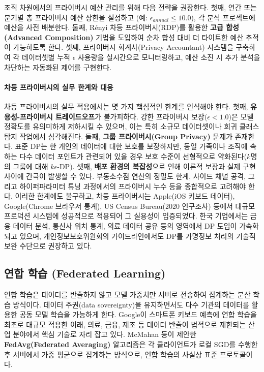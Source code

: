 조직 차원에서의 프라이버시 예산 관리를 위해 다음 전략을 권장한다.
첫째, 연간 또는 분기별 총 프라이버시 예산 상한을 설정하고
(예: $\epsilon_{annual} \leq 10.0$), 각 분석 프로젝트에 예산을 사전 배분한다.
둘째, R\'{e}nyi 차등 프라이버시(RDP)를 활용한
\textbf{고급 합성(Advanced Composition)} 기법을 도입하여
순차 합성 대비 더 타이트한 예산 추적이 가능하도록 한다.
셋째, 프라이버시 회계사(Privacy Accountant) 시스템을 구축하여
각 데이터셋별 누적 $\epsilon$ 사용량을 실시간으로 모니터링하고,
예산 소진 시 추가 분석을 차단하는 자동화된 제어를 구현한다.

\paragraph{차등 프라이버시의 실무 한계와 대응}

차등 프라이버시의 실무 적용에서는 몇 가지 핵심적인 한계를 인식해야 한다. 첫째, \textbf{유용성-프라이버시 트레이드오프}가 불가피하다. 강한 프라이버시 보장($\epsilon < 1.0$)은 모델 정확도를 유의미하게 저하시킬 수 있으며, 이는 특히 소규모 데이터셋이나 희귀 클래스 탐지 작업에서 심각해진다. 둘째, \textbf{그룹 프라이버시(Group Privacy)} 문제가 존재한다. 표준 DP는 한 개인의 데이터에 대한 보호를 보장하지만, 동일 가족이나 조직에 속하는 다수 데이터 포인트가 관련되어 있을 경우 보호 수준이 선형적으로 약화된다($k$명의 그룹에 대해 $k\epsilon$-DP). 셋째, \textbf{배포 환경의 복잡성}으로 인해 이론적 보장과 실제 구현 사이에 간극이 발생할 수 있다. 부동소수점 연산의 정밀도 한계, 사이드 채널 공격, 그리고 하이퍼파라미터 튜닝 과정에서의 프라이버시 누수 등을 종합적으로 고려해야 한다. 이러한 한계에도 불구하고, 차등 프라이버시는 Apple(iOS 키보드 데이터), Google(Chrome 브라우저 통계), US Census Bureau(2020 인구조사) 등에서 대규모 프로덕션 시스템에 성공적으로 적용되어 그 실용성이 입증되었다. 한국 기업에서는 금융 데이터 분석, 통신사 위치 통계, 의료 데이터 공유 등의 영역에서 DP 도입이 가속화되고 있으며, 개인정보보호위원회의 가이드라인에서도 DP를 가명정보 처리의 기술적 보완 수단으로 권장하고 있다.

\subsection{연합 학습 (Federated Learning)}
\label{sec:15.2.2}

연합 학습은 데이터를 반출하지 않고 모델 가중치만 서버로 전송하여 집계하는 분산 학습 방식이다. 데이터 주권(data sovereignty)을 유지하면서도 다수 기관의 데이터를 활용한 공동 모델 학습을 가능하게 한다. Google이 스마트폰 키보드 예측에 연합 학습을 최초로 대규모 적용한 이래, 의료, 금융, 제조 등 데이터 반출이 법적으로 제한되는 산업 분야에서 핵심 기술로 자리 잡고 있다. McMahan 등이 제안한 \textbf{FedAvg(Federated Averaging)} 알고리즘은 각 클라이언트가 로컬 SGD를 수행한 후 서버에서 가중 평균으로 집계하는 방식으로, 연합 학습의 사실상 표준 프로토콜이다.

